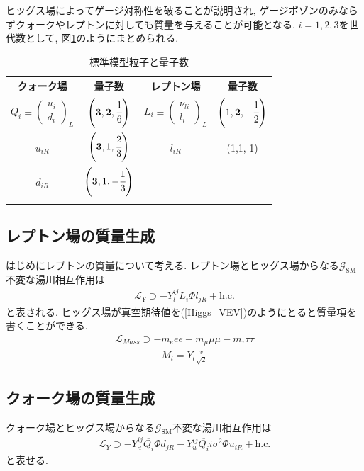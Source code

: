 ヒッグス場によってゲージ対称性を破ることが説明され, ゲージボゾンのみならずクォークやレプトンに対しても質量を与えることが可能となる.
$i=1,2,3$を世代数として, 図\ref{fig_sm}のようにまとめられる.
\begin{table}[ht]
  \caption{標準模型粒子と量子数}
  \begin{center}
    \begin{tabular}{cc|cc}\hline
  クォーク場　& 量子数 & レプトン場 & 量子数 \\\hline\hline
  $Q_i\equiv\begin{pmatrix}
    u_i \\
    d_i
  \end{pmatrix}_{L}$
 & $\left(\bm{3}, \bm{2}, \cfrac{1}{6}\right)$ &  $L_i\equiv\begin{pmatrix}
    \nu_{li} \\
    l_i
  \end{pmatrix}_{L}$ & $\left(1,\bm{2},-\cfrac{1}{2}\right)$ \\
  $u_{iR}$ & $\left(\bm{3},1,\cfrac{2}{3}\right)$ & $l_{iR}$ & (1,1,-1) \\
  $d_{iR}$ & $\left(\bm{3},1,-\cfrac{1}{3}\right)$ & & \\\hline
  \label{fig_sm}
    \end{tabular}
  \end{center}
\end{table}
\subsection{レプトン場の質量生成}
はじめにレプトンの質量について考える.
レプトン場とヒッグス場からなる$\mathcal{G}_{\mathrm{SM}}$不変な湯川相互作用は
\begin{align}
  \mathcal{L}_Y \supset -Y_{l}^{ij} \overline{L_i}\Phi l_{jR} +\mathrm{h.c.}
\end{align}
と表される.
ヒッグス場が真空期待値を(\ref{Higgs_VEV})のようにとると質量項を書くことができる.
\begin{align}
  \mathcal{L}_{Mass} \supset -m_e\bar{e}e -m_\mu \bar{\mu} \mu - m_\tau \bar{\tau}\tau\nonumber
\end{align}
\begin{align}
  M_l = Y_l\frac{v}{\sqrt{2}}
\end{align}
\subsection{クォーク場の質量生成}
クォーク場とヒッグス場からなる$\mathcal{G}_{\mathrm{SM}}$不変な湯川相互作用は
\begin{align}
  \mathcal{L}_Y \supset -Y_{d}^{ij} \overline{Q_i}\Phi d_{jR} -Y_{u}^{ij} \overline{Q_i}i\sigma^2\Phi u_{iR} +\mathrm{h.c.}
\end{align}
と表せる.

